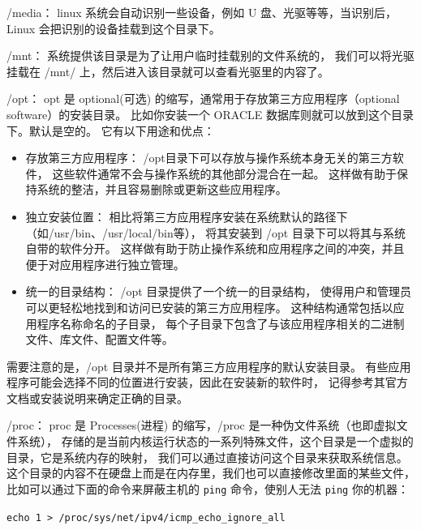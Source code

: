\documentclass{ctexart}
\begin{document}
    /media：
    linux 系统会自动识别一些设备，例如 U 盘、光驱等等，当识别后，Linux 会把识别的设备挂载到这个目录下。

    /mnt：
    系统提供该目录是为了让用户临时挂载别的文件系统的，
    我们可以将光驱挂载在 /mnt/ 上，然后进入该目录就可以查看光驱里的内容了。

    /opt：
    opt 是 optional(可选) 的缩写，通常用于存放第三方应用程序（optional software）的安装目录。
    比如你安装一个 ORACLE 数据库则就可以放到这个目录下。默认是空的。
    它有以下用途和优点：

    \begin{itemize}[labelindent=\parindent, leftmargin=*, align=left]
        \item 存放第三方应用程序：
                /opt目录下可以存放与操作系统本身无关的第三方软件，
                这些软件通常不会与操作系统的其他部分混合在一起。
                这样做有助于保持系统的整洁，并且容易删除或更新这些应用程序。
        \item 独立安装位置：
                相比将第三方应用程序安装在系统默认的路径下（如/usr/bin、/usr/local/bin等），
                将其安装到 /opt 目录下可以将其与系统自带的软件分开。
                这样做有助于防止操作系统和应用程序之间的冲突，并且便于对应用程序进行独立管理。
        \item 统一的目录结构：
                /opt 目录提供了一个统一的目录结构，
                使得用户和管理员可以更轻松地找到和访问已安装的第三方应用程序。
                这种结构通常包括以应用程序名称命名的子目录，
                每个子目录下包含了与该应用程序相关的二进制文件、库文件、配置文件等。
    \end{itemize}

    需要注意的是，/opt 目录并不是所有第三方应用程序的默认安装目录。
    有些应用程序可能会选择不同的位置进行安装，因此在安装新的软件时，
    记得参考其官方文档或安装说明来确定正确的目录。

    /proc：
    proc 是 Processes(进程) 的缩写，/proc 是一种伪文件系统（也即虚拟文件系统），
    存储的是当前内核运行状态的一系列特殊文件，这个目录是一个虚拟的目录，它是系统内存的映射，
    我们可以通过直接访问这个目录来获取系统信息。
    这个目录的内容不在硬盘上而是在内存里，我们也可以直接修改里面的某些文件，
    比如可以通过下面的命令来屏蔽主机的 \texttt{ping} 命令，使别人无法 \texttt{ping} 你的机器：

    \begin{mybox}
        \texttt{echo 1 > /proc/sys/net/ipv4/icmp\_echo\_ignore\_all}
    \end{mybox}
\end{document}
